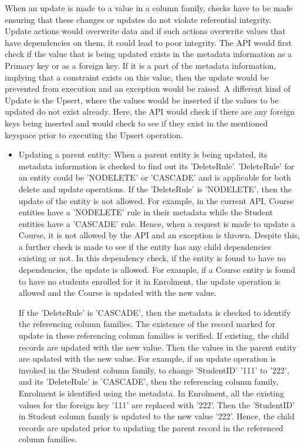 \begin{description}
When an update is made to a value in a column family, checks have to
be made ensuring that these changes or updates do not violate referential
integrity. Update actions would overwrite data and if such actions overwrite
values that have dependencies on them, it could lead to poor integrity. The API
would first check if the value that is being updated exists in the metadata
information as a Primary key or as a foreign key. If it is a part of the
metadata information, implying that a constraint exists on this value, then the
update would be prevented from execution and an exception would be raised.
A different kind of Update is the Upsert, where the values would be inserted if
the values to be updated do not exist already. Here, the API would check if
there are any foreign keys being inserted and would check to see if they exist
in the mentioned keyspace prior to executing the Upsert operation.
\begin{itemize}
\item Updating a parent entity: When a parent entity is being updated, its
metadata information is checked to find out its 'DeleteRule'. 'DeleteRule' for an entity
could be 'NODELETE' or 'CASCADE' and is applicable for both delete and update
operations. If the 'DeleteRule' is 'NODELETE', then the update of the entity is
not allowed. For example, in the current API, Course entities have a 'NODELETE'
rule in their metadata while the Student entities have a 'CASCADE' rule. Hence,
when a request is made to update a Course, it is not allowed by the API and an
exception is thrown. Despite this, a further check is made to see if the entity
has any child dependencies existing or not. In this dependency check, if the
entity is found to have no dependencies, the update is allowed.  For example, if
a Course entity is found to have no students enrolled for it in Enrolment, the
update operation is allowed and the Course is updated with the new value.

If the 'DeleteRule' is 'CASCADE', then the metadata is checked to identify the
referencing column families. The existence of the record marked for update in
these referencing column families is verified. If existing, the child records
are updated with the new value. Then the values in the parent entity are updated
with the new value. For example, if an update operation is invoked in the
Student column family, to change 'StudentID' '111' to '222', and its
'DeleteRule' is 'CASCADE', then the referencing column family, Enrolment is
identified using the metadata. In Enrolment, all the existing values for the
foreign key '111' are replaced with '222'. Then the 'StudentID' in Student
column family is updated to the new value '222'. Hence, the child records are
updated prior to updating the parent record in the referenced column families.


\end{itemize}
\end{description}
